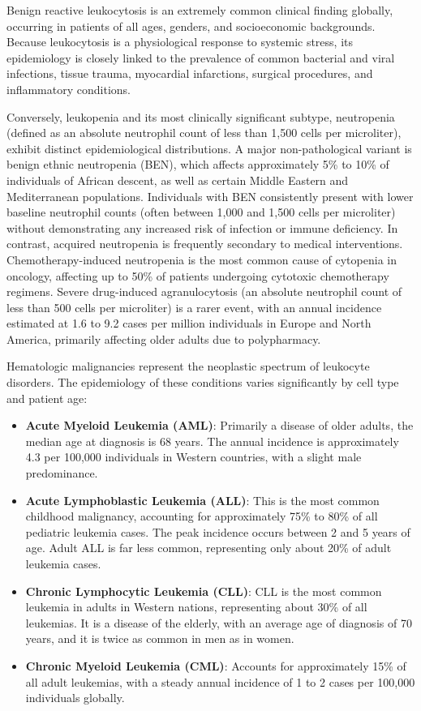 Benign reactive leukocytosis is an extremely common clinical finding globally, occurring in patients of all ages, genders, and socioeconomic backgrounds. Because leukocytosis is a physiological response to systemic stress, its epidemiology is closely linked to the prevalence of common bacterial and viral infections, tissue trauma, myocardial infarctions, surgical procedures, and inflammatory conditions.

Conversely, leukopenia and its most clinically significant subtype, neutropenia (defined as an absolute neutrophil count of less than 1,500 cells per microliter), exhibit distinct epidemiological distributions. A major non-pathological variant is benign ethnic neutropenia (BEN), which affects approximately 5\% to 10\% of individuals of African descent, as well as certain Middle Eastern and Mediterranean populations. Individuals with BEN consistently present with lower baseline neutrophil counts (often between 1,000 and 1,500 cells per microliter) without demonstrating any increased risk of infection or immune deficiency. In contrast, acquired neutropenia is frequently secondary to medical interventions. Chemotherapy-induced neutropenia is the most common cause of cytopenia in oncology, affecting up to 50\% of patients undergoing cytotoxic chemotherapy regimens. Severe drug-induced agranulocytosis (an absolute neutrophil count of less than 500 cells per microliter) is a rarer event, with an annual incidence estimated at 1.6 to 9.2 cases per million individuals in Europe and North America, primarily affecting older adults due to polypharmacy.

Hematologic malignancies represent the neoplastic spectrum of leukocyte disorders. The epidemiology of these conditions varies significantly by cell type and patient age:
\begin{itemize}
  \item \textbf{Acute Myeloid Leukemia (AML)}: Primarily a disease of older adults, the median age at diagnosis is 68 years. The annual incidence is approximately 4.3 per 100,000 individuals in Western countries, with a slight male predominance.
  \item \textbf{Acute Lymphoblastic Leukemia (ALL)}: This is the most common childhood malignancy, accounting for approximately 75\% to 80\% of all pediatric leukemia cases. The peak incidence occurs between 2 and 5 years of age. Adult ALL is far less common, representing only about 20\% of adult leukemia cases.
  \item \textbf{Chronic Lymphocytic Leukemia (CLL)}: CLL is the most common leukemia in adults in Western nations, representing about 30\% of all leukemias. It is a disease of the elderly, with an average age of diagnosis of 70 years, and it is twice as common in men as in women.
  \item \textbf{Chronic Myeloid Leukemia (CML)}: Accounts for approximately 15\% of all adult leukemias, with a steady annual incidence of 1 to 2 cases per 100,000 individuals globally.
\end{itemize}

